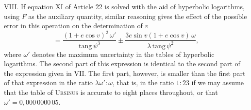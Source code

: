 VIII. If equation XI of Article 22 is solved with the aid of hyperbolic logarithms, using $F$ as the auxiliary quantity, similar reasoning gives the effect of the possible error in this operation on the determination of $v$
\[
= \frac{(1+e\cos v)^2\,\omega'}{\mathrm{tang}\,\psi^3} \pm \frac{3e\sin v(1+e\cos v)\,\omega}{\lambda\,\mathrm{tang}\,\psi^2},
\]
where $\omega'$ denotes the maximum uncertainty in the tables of hyperbolic logarithms. The second part of this expression is identical to the second part of the expression given in VII. The first part, however, is smaller than the first part of that expression in the ratio $\lambda\omega' : \omega$, that is, in the ratio $1:23$ if we may assume that the table of \textsc{Ursinus} is accurate to eight places throughout, or that $\omega' = 0{,}000\,0000\,05$.
